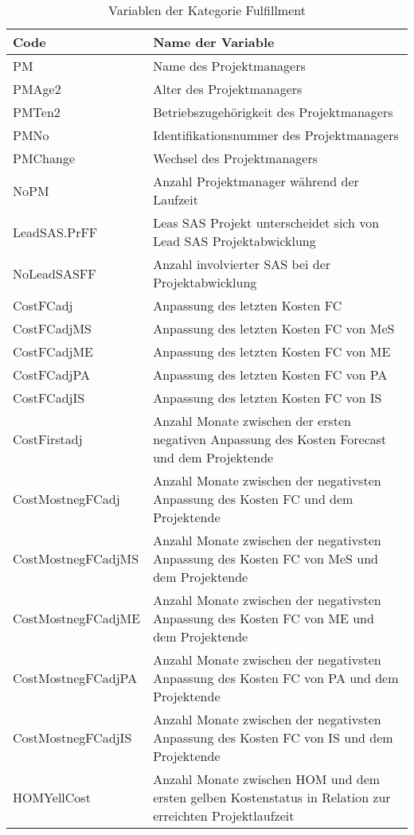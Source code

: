 \begin{longtable}[ht]{p{}p{}}
 	\caption{Variablen der Kategorie Fulfillment}\\
 	\toprule
		\textbf{Code} & \textbf{Name der Variable} \\  \endfirsthead\endhead
		\midrule
		PM    & Name des Projektmanagers \\
		PMAge2 & Alter des Projektmanagers \\
		PMTen2 & Betriebszugehörigkeit des Projektmanagers  \\
		PMNo  & Identifikationsnummer des Projektmanagers  \\
		PMChange & Wechsel des Projektmanagers \\
		NoPM  & Anzahl Projektmanager während der Laufzeit \\
		LeadSAS.PrFF & Leas SAS Projekt unterscheidet sich von Lead SAS Projektabwicklung \\
		NoLeadSASFF & Anzahl involvierter SAS bei der Projektabwicklung\\
		CostFCadj & Anpassung des letzten Kosten FC \\
		CostFCadjMS & Anpassung des letzten Kosten FC von MeS \\
		CostFCadjME & Anpassung des letzten Kosten FC von ME \\
		CostFCadjPA & Anpassung des letzten Kosten FC von PA \\
		CostFCadjIS & Anpassung des letzten Kosten FC von IS \\
		CostFirstadj & Anzahl Monate zwischen der ersten  negativen Anpassung des Kosten Forecast und dem Projektende \\
		CostMostnegFCadj & Anzahl Monate zwischen der negativsten Anpassung des Kosten FC und dem Projektende \\
		CostMostnegFCadjMS & Anzahl Monate zwischen der negativsten Anpassung des Kosten FC von MeS und dem Projektende  \\
		CostMostnegFCadjME & Anzahl Monate zwischen der negativsten Anpassung des Kosten FC von ME und dem Projektende  \\
		CostMostnegFCadjPA & Anzahl Monate zwischen der negativsten Anpassung des Kosten FC von PA und dem Projektende  \\
		CostMostnegFCadjIS & Anzahl Monate zwischen der negativsten Anpassung des Kosten FC von IS und dem Projektende  \\
		HOMYellCost & Anzahl Monate zwischen HOM und dem ersten gelben Kostenstatus in Relation zur erreichten Projektlaufzeit \\

\end{longtable}
